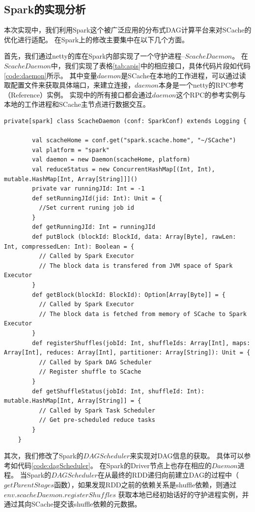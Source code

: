 \subsection{Spark的实现分析}
本次实现中，我们利用Spark这个被广泛应用的分布式DAG计算平台来对SCache的优化进行适配。
在Spark上的修改主要集中在以下几个方面。

首先，我们通过netty\cite{netty}的库在Spark内部实现了一个守护进程--$ScacheDaemon$。
在$ScacheDaemon$中，我们实现了表格\ref{tab:apis}中的相应接口，具体代码片段如代码\ref{code:daemon}所示。
其中变量$daemon$是SCache在本地的工作进程，可以通过读取配置文件来获取具体端口，来建立连接，$daemon$本身是一个netty的RPC参考（Reference）实例。
实现中的所有接口都会通过$daemon$这个RPC的参考实例与本地的工作进程和SCache主节点进行数据交互。

\begin{lstlisting}[style={myScalastyle}, caption={ScacheDaemon代码片段}, label={code:daemon}]
    private[spark] class ScacheDaemon (conf: SparkConf) extends Logging {

        val scacheHome = conf.get("spark.scache.home", "~/SCache")
        val platform = "spark"  
        val daemon = new Daemon(scacheHome, platform)   
        val reduceStatus = new ConcurrentHashMap[(Int, Int), mutable.HashMap[Int, Array[String]]]() 
        private var runningJId: Int = -1    
        def setRunningJId(jid: Int): Unit = {
          //Set current runing job id
        }   
        def getRunningJId: Int = runningJId 
        def putBlock (blockId: BlockId, data: Array[Byte], rawLen: Int, compressedLen: Int): Boolean = {
          // Called by Spark Executor
          // The block data is transfered from JVM space of Spark Executor
        }   
        def getBlock(blockId: BlockId): Option[Array[Byte]] = {
          // Called by Spark Executor
          // The block data is fetched from memory of SCache to Spark Executor
        }   
        def registerShuffles(jobId: Int, shuffleIds: Array[Int], maps: Array[Int], reduces: Array[Int], partitioner: Array[String]): Unit = {
          // Called by Spark DAG Scheduler
          // Register shuffle to SCache
        }   
        def getShuffleStatus(jobId: Int, shuffleId: Int): mutable.HashMap[Int, Array[String]] = {
          // Called by Spark Task Scheduler
          // Get pre-scheduled reduce tasks
        }   
    }
\end{lstlisting}

其次，我们修改了Spark的$DAGScheduler$来实现对DAG信息的获取。
具体可以参考如代码\ref{code:dagScheduler}。
在Spark的Driver节点上也存在相应的$Daemon$进程。
当Spark的$DAGScheduler$在从最终的RDD递归向前建立DAG的过程中（$getParentStages$函数），如果发现RDD之前的依赖关系是shuffle依赖，则通过$env.scacheDaemon.registerShuffles$
获取本地已经初始话好的守护进程实例，并通过其向SCache提交该shuffle依赖的元数据。

